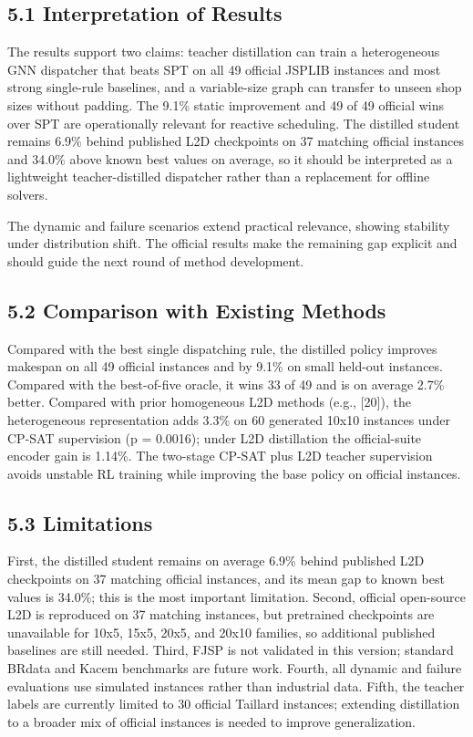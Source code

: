 \documentclass{article}
\begin{document}
\subsection*{5.1 Interpretation of Results}

The results support two claims: teacher distillation can train a heterogeneous GNN dispatcher that beats SPT on all 49 official JSPLIB instances and most strong single-rule baselines, and a variable-size graph can transfer to unseen shop sizes without padding. The 9.1\% static improvement and 49 of 49 official wins over SPT are operationally relevant for reactive scheduling. The distilled student remains 6.9\% behind published L2D checkpoints on 37 matching official instances and 34.0\% above known best values on average, so it should be interpreted as a lightweight teacher-distilled dispatcher rather than a replacement for offline solvers.

The dynamic and failure scenarios extend practical relevance, showing stability under distribution shift. The official results make the remaining gap explicit and should guide the next round of method development.


\subsection*{5.2 Comparison with Existing Methods}

Compared with the best single dispatching rule, the distilled policy improves makespan on all 49 official instances and by 9.1\% on small held-out instances. Compared with the best-of-five oracle, it wins 33 of 49 and is on average 2.7\% better. Compared with prior homogeneous L2D methods (e.g., {[}20{]}), the heterogeneous representation adds 3.3\% on 60 generated 10x10 instances under CP-SAT supervision (p = 0.0016); under L2D distillation the official-suite encoder gain is 1.14\%. The two-stage CP-SAT plus L2D teacher supervision avoids unstable RL training while improving the base policy on official instances.


\subsection*{5.3 Limitations}

First, the distilled student remains on average 6.9\% behind published L2D checkpoints on 37 matching official instances, and its mean gap to known best values is 34.0\%; this is the most important limitation. Second, official open-source L2D is reproduced on 37 matching instances, but pretrained checkpoints are unavailable for 10x5, 15x5, 20x5, and 20x10 families, so additional published baselines are still needed. Third, FJSP is not validated in this version; standard BRdata and Kacem benchmarks are future work. Fourth, all dynamic and failure evaluations use simulated instances rather than industrial data. Fifth, the teacher labels are currently limited to 30 official Taillard instances; extending distillation to a broader mix of official instances is needed to improve generalization.
\end{document}

